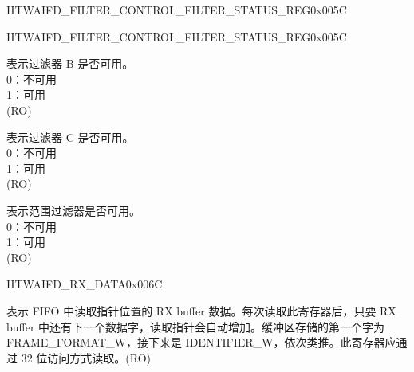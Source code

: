 \begin{register}{H}{TWAIFD\_FILTER\_CONTROL\_FILTER\_STATUS\_REG}{0x005C}
\begin{regdesc}
\begin{reglist}
\item [见下页...]
\end{reglist}\end{regdesc}
\end{register}

\addtocounter{Regfloat}{-1}
\begin{register}{H}{TWAIFD\_FILTER\_CONTROL\_FILTER\_STATUS\_REG}{0x005C}
\begin{regdesc}\begin{reglist}
\item [...接上页]

\label{fielddesc:TWAIFDSFB}\item [TWAIFD\_SFB] 表示过滤器 B 是否可用。\\0：不可用\\1：可用\\(RO)
\label{fielddesc:TWAIFDSFC}\item [TWAIFD\_SFC] 表示过滤器 C 是否可用。\\0：不可用\\1：可用\\(RO)
\label{fielddesc:TWAIFDSFR}\item [TWAIFD\_SFR] 表示范围过滤器是否可用。\\0：不可用\\1：可用\\(RO)
\end{reglist}\end{regdesc}
\end{register}


\begin{register}{H}{TWAIFD\_RX\_DATA}{0x006C}\label{regdesc:TWAIFDRXDATAREG}
%
\regnewline%
\begin{regdesc}\begin{reglist}
\label{fielddesc:TWAIFDRXDATA}\item [TWAIFD\_RX\_DATA] 表示 FIFO 中读取指针位置的 RX buffer 数据。每次读取此寄存器后，只要 RX buffer 中还有下一个数据字，读取指针会自动增加。缓冲区存储的第一个字为 FRAME\_FORMAT\_W，接下来是 IDENTIFIER\_W，依次类推。此寄存器应通过 32 位访问方式读取。(RO)
\end{reglist}\end{regdesc}
\end{register}



